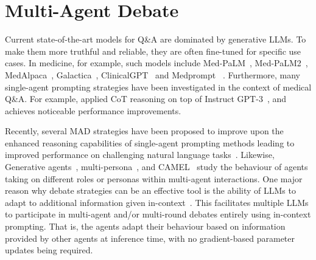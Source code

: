 \documentclass{article}  %
\begin{document}


\section{Multi-Agent Debate} \label{sec:mad-strategies}

Current state-of-the-art models for Q\&A are dominated by generative LLMs. To make them more truthful and reliable, they are often fine-tuned for specific use cases. In medicine, for example, such models include 
Med-PaLM~\citep{singhal2022large}, 
Med-PaLM2~\citep{singhal2023medpalm}, 
MedAlpaca~\citep{han2023medalpaca}, 
Galactica~\citep{taylor2022galactica},
ClinicalGPT~\citep{wang2023clinicalgpt} and Medprompt ~\citep{nori2023medprompt}. 
Furthermore, many single-agent prompting strategies have been investigated in the context of medical Q\&A. 
For example, \citet{lievin2022can} %
applied CoT reasoning on top of Instruct GPT-3~\citep{ouyang2022training}, and achieves noticeable performance improvements.

Recently, several MAD strategies have been proposed to improve upon the enhanced reasoning capabilities of single-agent prompting methods %
leading to improved performance on challenging natural language tasks~\citep{du2023improving, liang2023encouraging, chan2023chateval}. 
Likewise, Generative agents~\citep{park2023generative}, multi-persona~\citep{wang2023unleashing}, and CAMEL~\citep{li2023camel} study the behaviour of agents taking on different roles or personas within multi-agent interactions. 
One major reason why debate strategies can be an effective tool is the ability of LLMs to adapt to additional information given in-context~\citep{zhang2023and}. 
This facilitates multiple LLMs to participate in multi-agent and/or multi-round debates entirely using in-context prompting. That is, the agents adapt their behaviour based on information provided by other agents at inference time, with no gradient-based parameter updates being required. 
\end{document}

